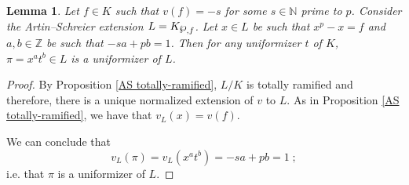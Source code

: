 \documentclass[a4paper,english,12pt]{amsart}
\newtheorem{lemma}[definition]{Lemma}
\numberwithin{equation}{section}
\renewcommand{\wp}{\ensuremath\raisebox{\depth}{$\mathchar"17D$}}
\renewcommand{\_}{\rule{0.25cm}{0.4pt}}
\begin{document}
\begin{lemma}\label{uniformizador de L}
     Let $f\in K$ such that $v(f)=-s$ for some $s\in \mathbb{N}$ prime to $p$. Consider the Artin--Schreier extension $L=K_{\wp, f}$. Let $x\in L$ be such that $x^{p}-x=f$ and $a,b\in \mathbb{Z}$ be such that $-sa+pb=1$.
    Then for any uniformizer $t$ of $K$, $\pi=x^{a}t^{b}\in L$ is a uniformizer of $L$.
\end{lemma}
\begin{proof}
    By Proposition \ref{AS totally-ramified}, $L/K$ is totally ramified and therefore, there is a unique normalized extension of $v$ to $L$. As in Proposition \ref{AS totally-ramified}, we have that $v_{L}(x)=v(f)$.

    We can conclude that
    \[
    v_{L}(\pi)=v_{L}(x^{a}t^{b})=-sa+pb=1\;;
    \]
    i.e. that $\pi$ is a uniformizer of $L$.
\end{proof}
\end{document}
